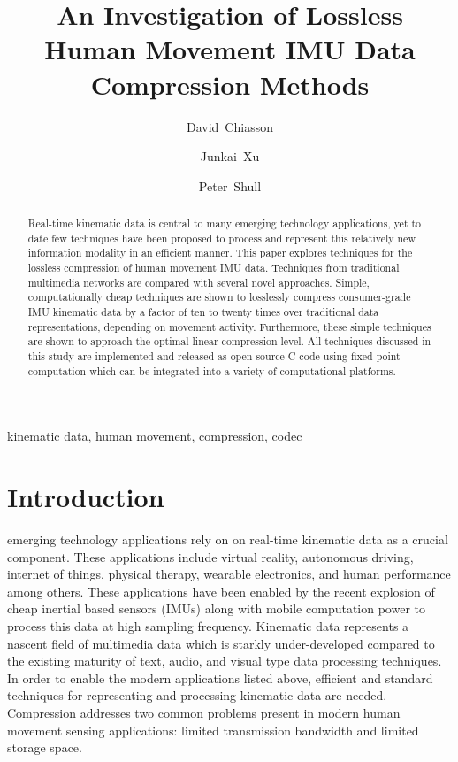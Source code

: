 \documentclass[journal]{IEEEtran}
\begin{document}
\title{An Investigation of Lossless Human Movement IMU Data Compression Methods}

\author[1]{David~Chiasson}
\author[1]{Junkai~Xu}
\author[1]{Peter~Shull}

\maketitle

\begin{abstract}
Real-time kinematic data is central to many emerging technology applications, yet to date few techniques have been proposed to process and represent this relatively new information modality in an efficient manner. This paper explores techniques for the lossless compression of human movement IMU data. Techniques from traditional multimedia networks are compared with several novel approaches. Simple, computationally cheap techniques are shown to losslessly compress consumer-grade IMU kinematic data by a factor of ten to twenty times over traditional data representations, depending on movement activity. Furthermore, these simple techniques are shown to approach the optimal linear compression level. All techniques discussed in this study are implemented and released as open source C code using fixed point computation which can be integrated into a variety of computational platforms. 
\end{abstract}

\begin{IEEEkeywords}
kinematic data, human movement, compression, codec
\end{IEEEkeywords}



\section{Introduction}

 emerging technology applications rely on on real-time kinematic data as a crucial component. These applications include virtual reality, autonomous driving, internet of things, physical therapy, wearable electronics, and human performance among others. These applications have been enabled by the recent explosion of cheap inertial based sensors (IMUs) along with mobile computation power to process this data at high sampling frequency. Kinematic data represents a nascent field of multimedia data which is starkly under-developed compared to the existing maturity of text, audio, and visual type data processing techniques. In order to enable the modern applications listed above, efficient and standard techniques for representing and processing kinematic data are needed. Compression addresses two common problems present in modern human movement sensing applications: limited transmission bandwidth and limited storage space.
\end{document}
